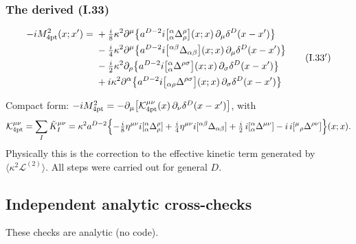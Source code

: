 \subsubsection{The derived (I.33)}
\begin{resultbox}
\begin{equation*}\label{eq:t3-I33}
\begin{aligned}
-iM^2_{\rm 4pt}(x;x')={}&+\tfrac i8\kappa^2\partial^\mu\bigl\{a^{D-2}i\bigl[{}^\alpha_\alpha\Delta^\rho_\rho\bigr](x;x)\,\partial_\mu\delta^D(x-x')\bigr\}\\
&-\tfrac i4\kappa^2\partial^\mu\bigl\{a^{D-2}i\bigl[{}^{\alpha\beta}\Delta_{\alpha\beta}\bigr](x;x)\,\partial_\mu\delta^D(x-x')\bigr\}\\
&-\tfrac i2\kappa^2\partial_\rho\bigl\{a^{D-2}i\bigl[{}^\alpha_\alpha\Delta^{\rho\sigma}\bigr](x;x)\,\partial_\sigma\delta^D(x-x')\bigr\}\\
&+i\kappa^2\partial^\alpha\bigl\{a^{D-2}i\bigl[{}_{\alpha\rho}\Delta^{\rho\sigma}\bigr](x;x)\,\partial_\sigma\delta^D(x-x')\bigr\}
\end{aligned}
\tag{I.33$'$}
\end{equation*}
\end{resultbox}
Compact form: \(-iM^2_{\rm 4pt}=-\partial_\mu\bigl[\mathcal K^{\mu\nu}_{\rm 4pt}(x)\,\partial_\nu\delta^D(x-x')\bigr]\), with
\begin{equation}\label{eq:t3-Kcal}
\mathcal K^{\mu\nu}_{\rm 4pt}=\sum_I\tilde K_I^{\mu\nu}=\kappa^2a^{D-2}\Bigl\{-\tfrac i8\eta^{\mu\nu}i[{}^\alpha_\alpha\Delta^\rho_\rho]
+\tfrac i4\eta^{\mu\nu}i[{}^{\alpha\beta}\Delta_{\alpha\beta}]+\tfrac i2\,i[{}^\alpha_\alpha\Delta^{\mu\nu}]-i\,i[{}^\mu{}_\rho\Delta^{\rho\nu}]\Bigr\}(x;x).
\end{equation}
Physically this is the correction to the effective kinetic term generated by
\(\langle\kappa^2\mathcal L^{(2)}\rangle\). All steps were carried out for general \(D\).

\subsection{Independent analytic cross-checks \texorpdfstring{\tC}{}}\label{sec:t3-anal-checks}
These checks are analytic (no code).

